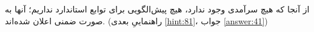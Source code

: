 \section{}
\paragraph{}\label{hint:285}
از آنجا که هیچ سرآمدی وجود ندارد، هیچ پیش‌الگویی برای توابع استاندارد نداریم؛ آنها به صورت ضمنی اعلان شده‌اند. (راهنماییِ بعدی \ref{hint:81}، جواب \ref{answer:41})